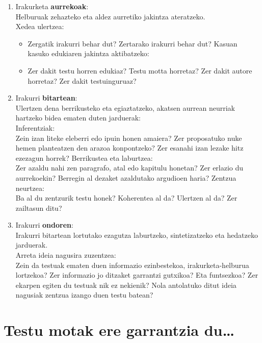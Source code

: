 \documentclass[]{book}
\providecommand{\tightlist}{%
  \setlength{\itemsep}{0pt}\setlength{\parskip}{0pt}}
\begin{document}
\begin{enumerate}
\def\labelenumi{\arabic{enumi}.}
\tightlist
\item
  Irakurketa \textbf{aurrekoak}:\\
  Helburuak zehazteko eta aldez aurretiko jakintza ateratzeko.\\
  Xedea ulertzea:

  \begin{itemize}
  \tightlist
  \item
    Zergatik irakurri behar dut? Zertarako irakurri behar dut?
    Kasuan kasuko edukiaren jakintza aktibatzeko:\\
  \item
    Zer dakit testu horren edukiaz? Testu motta horretaz? Zer dakit autore horretaz? Zer dakit testuinguruaz?
  \end{itemize}
\item
  Irakurri \textbf{bitartean}:\\
  Ulertzen dena berrikusteko eta egiaztatzeko, akatsen aurrean neurriak hartzeko bidea ematen duten jarduerak:\\
  Inferentziak:\\
  Zein izan liteke eleberri edo ipuin honen amaiera? Zer proposatuko nuke hemen planteatzen den arazoa konpontzeko? Zer esanahi izan lezake hitz ezezagun horrek?
  Berrikustea eta laburtzea:\\
  Zer azaldu nahi zen paragrafo, atal edo kapitulu honetan? Zer erlazio du aurrekoekin? Berregin al dezaket azaldutako argudioen haria?
  Zentzua neurtzea:\\
  Ba al du zentzurik testu honek? Koherentea al da? Ulertzen al da? Zer zailtasun ditu?
\item
  Irakurri \textbf{ondoren}:\\
  Irakurri bitartean lortutako ezagutza laburtzeko, sintetizatzeko eta hedatzeko jarduerak.\\
  Arreta ideia nagusira zuzentzea:\\
  Zein da testuak ematen duen informazio ezinbestekoa, irakurketa-helburua lortzekoa? Zer informazio jo ditzaket garrantzi gutxikoa? Eta funtsezkoa? Zer ekarpen egiten du testuak nik ez nekienik? Nola antolatuko ditut ideia nagusiak zentzua izango duen testu batean?
\end{enumerate}

\hypertarget{testu-motak-ere-garrantzia-du}{%
\section{Testu motak ere garrantzia du\ldots{}}\label{testu-motak-ere-garrantzia-du}}
\end{document}
